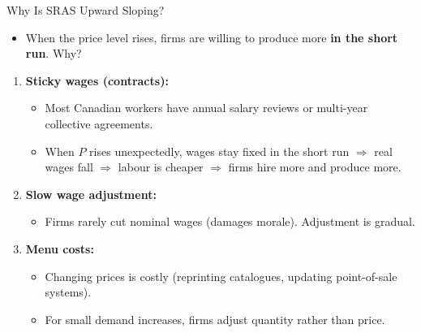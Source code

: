 \documentclass[aspectratio=169]{beamer}
\begin{document}
\begin{frame}{Why Is SRAS Upward Sloping?}
\transfade
\begin{itemize}[<+->]
  \item When the price level rises, firms are willing to produce more \textbf{in the short run}. Why?
\end{itemize}
\begin{enumerate}[<+->]
  \item \textbf{Sticky wages (contracts):}
  \begin{itemize}[<+->]
    \item Most Canadian workers have annual salary reviews or multi-year collective agreements.
    \item When $P$ rises unexpectedly, wages stay fixed in the short run $\Rightarrow$ real wages fall $\Rightarrow$ labour is cheaper $\Rightarrow$ firms hire more and produce more.
  \end{itemize}
  \item \textbf{Slow wage adjustment:}
  \begin{itemize}[<+->]
    \item Firms rarely cut nominal wages (damages morale). Adjustment is gradual.
  \end{itemize}
  \item \textbf{Menu costs:}
  \begin{itemize}[<+->]
    \item Changing prices is costly (reprinting catalogues, updating point-of-sale systems).
    \item For small demand increases, firms adjust quantity rather than price.
  \end{itemize}
\end{enumerate}
\end{frame}
\end{document}
